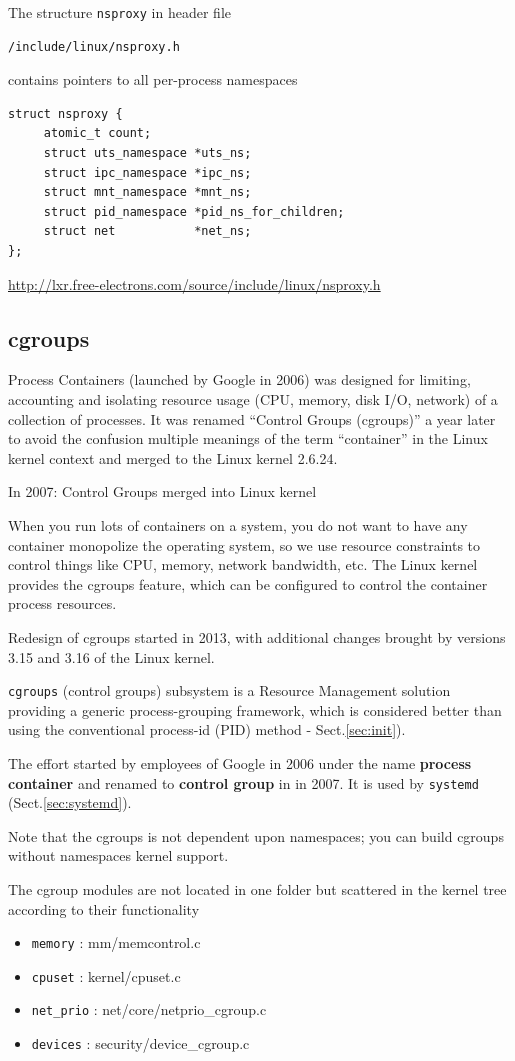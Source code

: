 The structure \verb!nsproxy! in header file 
\begin{verbatim}
/include/linux/nsproxy.h
\end{verbatim}
contains pointers to all per-process namespaces
\begin{verbatim}
struct nsproxy {
     atomic_t count;
     struct uts_namespace *uts_ns;
     struct ipc_namespace *ipc_ns;
     struct mnt_namespace *mnt_ns;
     struct pid_namespace *pid_ns_for_children;
     struct net           *net_ns;
};
\end{verbatim}
\url{http://lxr.free-electrons.com/source/include/linux/nsproxy.h}


\subsection{cgroups}
\label{sec:cgroups}


Process Containers (launched by Google in 2006) was designed for limiting,
accounting and isolating resource usage (CPU, memory, disk I/O, network) of a
collection of processes. It was renamed “Control Groups (cgroups)” a year later
to avoid the confusion multiple meanings of the term “container” in the Linux
kernel context and merged to the Linux kernel 2.6.24.


In 2007: Control Groups merged into Linux kernel

When you run lots of containers on a system, you do not want to have any
container monopolize the operating system, so we use resource constraints to
control things like CPU, memory, network bandwidth, etc. The Linux kernel
provides the cgroups feature, which can be configured to control the container
process resources.


Redesign of cgroups started in 2013, with additional changes brought by versions
3.15 and 3.16 of the Linux kernel.


\verb!cgroups! (control groups) subsystem is a Resource Management solution
providing a generic process-grouping framework, which is considered better than
using the conventional process-id (PID) method - Sect.\ref{sec:init}).

The effort started by employees of Google in 2006 under the name {\bf process
container} and renamed to {\bf control group} in in 2007. It is used by
\verb!systemd! (Sect.\ref{sec:systemd}).

Note that the cgroups is not dependent upon namespaces; you can build cgroups
without namespaces kernel support.


The cgroup modules are not located in one folder but
scattered in the kernel tree according to their functionality
\begin{itemize}
  \item \verb!memory!  : mm/memcontrol.c
  \item \verb!cpuset! : kernel/cpuset.c
  \item \verb!net_prio! : net/core/netprio\_cgroup.c
  \item \verb!devices! : security/device\_cgroup.c
\end{itemize}

